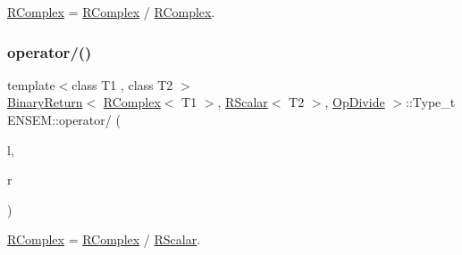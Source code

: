 \mbox{\hyperlink{classENSEM_1_1RComplex}{R\+Complex}} = \mbox{\hyperlink{classENSEM_1_1RComplex}{R\+Complex}} / \mbox{\hyperlink{classENSEM_1_1RComplex}{R\+Complex}}. 

\mbox{\label{group__rcomplex_ga249a0c4eb26560012c5090b615fadf26}} 
\subsubsection{\texorpdfstring{operator/()}{operator/()}\hspace{0.1cm}{\footnotesize\ttfamily [2/3]}}
{\footnotesize\ttfamily template$<$class T1 , class T2 $>$ \\
\mbox{\hyperlink{structENSEM_1_1BinaryReturn}{Binary\+Return}}$<$ \mbox{\hyperlink{classENSEM_1_1RComplex}{R\+Complex}}$<$ T1 $>$, \mbox{\hyperlink{classENSEM_1_1RScalar}{R\+Scalar}}$<$ T2 $>$, \mbox{\hyperlink{structENSEM_1_1OpDivide}{Op\+Divide}} $>$\+::Type\+\_\+t E\+N\+S\+E\+M\+::operator/ (\begin{DoxyParamCaption}\item[{const \mbox{\hyperlink{classENSEM_1_1RComplex}{R\+Complex}}$<$ T1 $>$ \&}]{l,  }\item[{const \mbox{\hyperlink{classENSEM_1_1RScalar}{R\+Scalar}}$<$ T2 $>$ \&}]{r }\end{DoxyParamCaption})\hspace{0.3cm}{\ttfamily [inline]}}



\mbox{\hyperlink{classENSEM_1_1RComplex}{R\+Complex}} = \mbox{\hyperlink{classENSEM_1_1RComplex}{R\+Complex}} / \mbox{\hyperlink{classENSEM_1_1RScalar}{R\+Scalar}}. 

\mbox{\label{group__rcomplex_gacaba74ac4d092284f9b979ce552b8beb}} 
